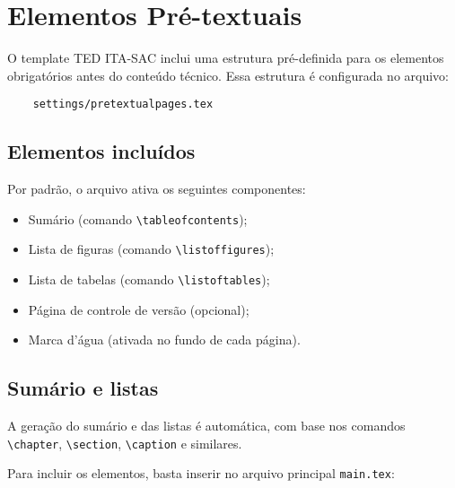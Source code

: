 \chapter{Elementos Pré-textuais}

O template TED ITA-SAC inclui uma estrutura pré-definida para os elementos obrigatórios antes do conteúdo técnico. Essa estrutura é configurada no arquivo:

\begin{verbatim}
	settings/pretextualpages.tex
\end{verbatim}

\section{Elementos incluídos}

Por padrão, o arquivo ativa os seguintes componentes:

\begin{itemize}
	\item Sumário (comando \texttt{\textbackslash tableofcontents});
	\item Lista de figuras (comando \texttt{\textbackslash listoffigures});
	\item Lista de tabelas (comando \texttt{\textbackslash listoftables});
	\item Página de controle de versão (opcional);
	\item Marca d’água (ativada no fundo de cada página).
\end{itemize}

\section{Sumário e listas}

A geração do sumário e das listas é automática, com base nos comandos \verb|\chapter|, \verb|\section|, \verb|\caption| e similares.

Para incluir os elementos, basta inserir no arquivo principal \texttt{main.tex}:

\begin{verbatim}
	
\end{verbatim}

